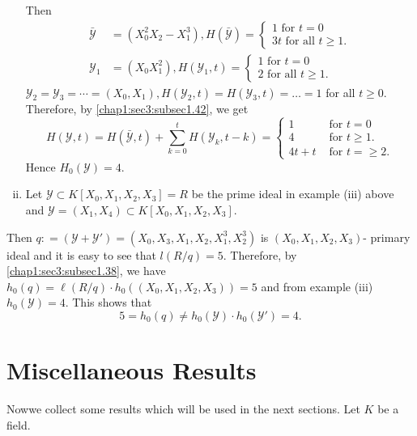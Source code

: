\begin{example}
\begin{enumerate}[(i)]
   Then 
   \begin{align*}
     \bar{\mathscr{Y}}& =(X^2_0 X_2 -X^3_1),  H(\bar{\mathscr{Y}})=
     \begin{cases}
       1 \text{ for } t = 0 \\
       3t \text{ for all } t \geq 1.
     \end{cases}\\
     \mathscr{Y}_1 &=(X_0 X^2_1 ),  H(\mathscr{Y}_1,t)=
     \begin{cases}
       1 \text{ for } t = 0 \\
       2 \text{ for all } t \geq 1.
     \end{cases}
   \end{align*}
   $\mathscr{Y}_2 =\mathscr{Y}_3 = \cdots = (X_0,X_1), H(\mathscr{Y}_2,t)
   = H(\mathscr{Y}_3,t)= \ldots = 1 $ for all $t \geq 0$. Therefore, by
   \ref{chap1:sec3:subsec1.42}, we get  
   \begin{equation*}
     H(\mathscr{Y},t) = H(\bar{\mathscr{Y}},t)+ \sum ^t_{k=0}
     H(\mathscr{Y}_k,t-k)= 
     \begin{cases}
       1    &\text{ for } t = 0 \\
       4    &\text{ for } t \geq 1.\\
       4t+t &\text{ for } t = \geq 2.
     \end{cases}
   \end{equation*}
   Hence $H_0(\mathscr{Y}) = 4$. 
 \item Let $\mathscr{Y} \subset K[X_0, X_1,X_2, X_3] = R $ be the prime
   ideal in example (iii) above and $\mathscr{Y} =(X_1,X_4) \subset
   K[X_0, X_1,X_2, X_3]$. 
\end{enumerate}
\end{example}

Then $q:  = (\mathscr{Y}+\mathscr{Y'}) = (X_0, X_3,X_1, X_2,X^3_1,X^3_2)$
is $(X_0, X_1,X_2, X_3)$- primary ideal and it is easy to see that $l
(R/ q) = 5$. Therefore, by \ref{chap1:sec3:subsec1.38}, we have $h_0 (q) = \ell (R/ q)\cdot
h_0 ((X_0, X_1,X_2, X_3))=5$ and from example (iii)
$h_0(\mathscr{Y})=4$. This shows that 
$$ 
5 = h_0(q) \neq h_0(\mathscr{Y})\cdot h_0(\mathscr{Y}') = 4.
$$

\section{Miscellaneous Results}\label{chap1:sec4} %

Now\pageoriginale we collect some results which will be used in the next
sections. Let $K$ be a field. 

